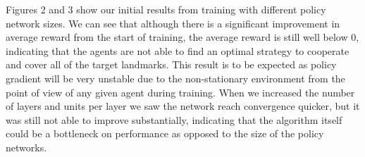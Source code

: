 \documentclass{article}
\begin{document}
Figures 2 and 3 show our initial results from training with different policy network sizes. We can see that although there is a significant improvement in average reward from the start of training, the average reward is still well below 0, indicating that the agents are not able to find an optimal strategy to cooperate and cover all of the target landmarks. This result is to be expected as policy gradient will be very unstable due to the non-stationary environment from the point of view of any given agent during training. When we increased the number of layers and units per layer we saw the network reach convergence quicker, but it was still not able to improve substantially, indicating that the algorithm itself could be a bottleneck on performance as opposed to the size of the policy networks.



\end{document}
